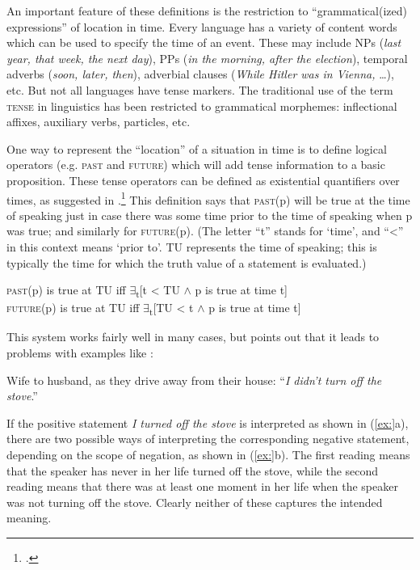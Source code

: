 An important feature of these definitions is the restriction to “grammatical(ized) expressions” of location in time. Every language has a variety of content words which can be used to specify the time of an event. These may include NPs (\textit{last year, that week, the next day}), PPs (\textit{in the morning, after the election}), temporal adverbs (\textit{soon, later, then}), adverbial clauses (\textit{While Hitler was in Vienna,} …), etc. But not all languages have tense markers. The traditional use of the term \textsc{tense} in linguistics has been restricted to grammatical morphemes: inflectional affixes, auxiliary verbs, particles, etc.



One way to represent the “location” of a situation in time is to define logical operators (e.g. \textsc{past} and \textsc{future}) which will add tense information to a basic proposition. These tense operators can be defined as existential quantifiers over times, as suggested in .\footnote{\citet{Prior1957,Prior1967}.} This definition says that \textsc{past}(p) will be true at the time of speaking just in case there was some time prior to the time of speaking when p was true; and similarly for \textsc{future}(p). (The letter “t” stands for ‘time’, and “<” in this context means ‘prior to’. TU represents the time of speaking; this is typically the time for which the truth value of a statement is evaluated.)


\ea
\textsc{past}(p) is true at TU  iff  ${\exists}$\textsubscript{t}[t < TU $\wedge$ p is true at time t]\\
\textsc{future}(p) is true at TU  iff  ${\exists}$\textsubscript{t}[TU < t $\wedge$ p is true at time t]
\z


This system works fairly well in many cases, but \citet{Partee1973} points out that it leads to problems with examples like :


\ea
Wife to husband, as they drive away from their house: “\textit{I didn’t turn off the stove}.”
\z


If the positive statement \textit{I turned off the stove} is interpreted as shown in (\ref{ex:}a), there are two possible ways of interpreting the corresponding negative statement, depending on the scope of negation, as shown in (\ref{ex:}b). The first reading means that the speaker has never in her life turned off the stove, while the second reading means that there was at least one moment in her life when the speaker was not turning off the stove. Clearly neither of these captures the intended meaning.


